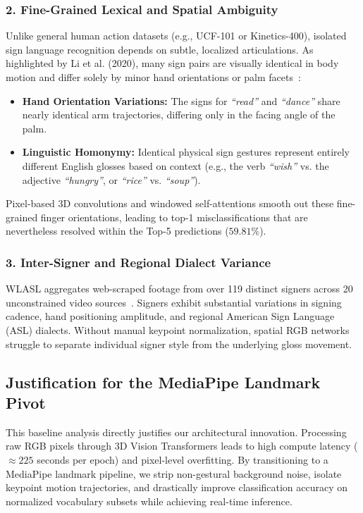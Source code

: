 \documentclass[12pt,a4paper]{article}
\begin{document}
\subsubsection{2. Fine-Grained Lexical and Spatial Ambiguity}
Unlike general human action datasets (e.g., UCF-101 or Kinetics-400), isolated sign language recognition depends on subtle, localized articulations. As highlighted by Li et al. (2020), many sign pairs are visually identical in body motion and differ solely by minor hand orientations or palm facets~\cite{li2020wlasl}:
\begin{itemize}
    \item \textbf{Hand Orientation Variations:} The signs for \textit{``read''} and \textit{``dance''} share nearly identical arm trajectories, differing only in the facing angle of the palm.
    \item \textbf{Linguistic Homonymy:} Identical physical sign gestures represent entirely different English glosses based on context (e.g., the verb \textit{``wish''} vs. the adjective \textit{``hungry''}, or \textit{``rice''} vs. \textit{``soup''}).
\end{itemize}
Pixel-based 3D convolutions and windowed self-attentions smooth out these fine-grained finger orientations, leading to top-1 misclassifications that are nevertheless resolved within the Top-5 predictions ($59.81\%$).

\subsubsection{3. Inter-Signer and Regional Dialect Variance}
WLASL aggregates web-scraped footage from over 119 distinct signers across 20 unconstrained video sources~\cite{li2020wlasl}. Signers exhibit substantial variations in signing cadence, hand positioning amplitude, and regional American Sign Language (ASL) dialects. Without manual keypoint normalization, spatial RGB networks struggle to separate individual signer style from the underlying gloss movement.

\subsection{Justification for the MediaPipe Landmark Pivot}
This baseline analysis directly justifies our architectural innovation. Processing raw RGB pixels through 3D Vision Transformers leads to high compute latency ($\approx 225$ seconds per epoch) and pixel-level overfitting. By transitioning to a MediaPipe landmark pipeline, we strip non-gestural background noise, isolate keypoint motion trajectories, and drastically improve classification accuracy on normalized vocabulary subsets while achieving real-time inference.
\end{document}
